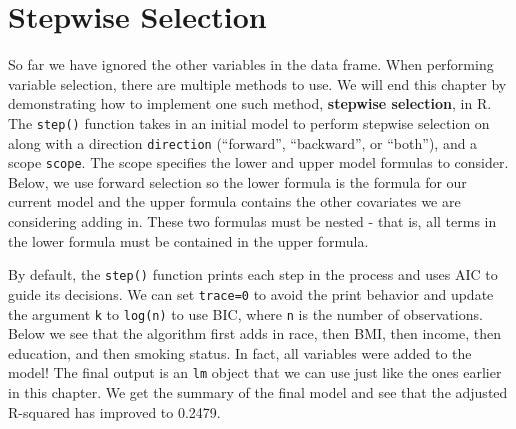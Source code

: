 \documentclass[
  letterpaper,
]{krantz}
\makeatletter
\newenvironment{Shaded}{\begin{snugshade}}{\end{snugshade}}
\newcommand{\CommentTok}[1]{\textcolor[rgb]{0.37,0.37,0.37}{#1}}
\newcommand{\DecValTok}[1]{\textcolor[rgb]{0.68,0.00,0.00}{#1}}
\newcommand{\FunctionTok}[1]{\textcolor[rgb]{0.28,0.35,0.67}{#1}}
\newcommand{\NormalTok}[1]{\textcolor[rgb]{0.00,0.23,0.31}{#1}}
\newcommand{\OtherTok}[1]{\textcolor[rgb]{0.00,0.23,0.31}{#1}}
\newcommand{\SpecialCharTok}[1]{\textcolor[rgb]{0.37,0.37,0.37}{#1}}
\newenvironment{kframe}{%
\medskip{}
\setlength{\fboxsep}{.8em}
 \def\at@end@of@kframe{}%
 \ifinner\ifhmode%
  \def\at@end@of@kframe{\end{minipage}}%
  \begin{minipage}{\columnwidth}%
 \fi\fi%
 \def\FrameCommand##1{\hskip\@totalleftmargin \hskip-\fboxsep
 \colorbox{shadecolor}{##1}\hskip-\fboxsep
     \hskip-\linewidth \hskip-\@totalleftmargin \hskip\columnwidth}%
 \MakeFramed {\advance\hsize-\width
   \@totalleftmargin\z@ \linewidth\hsize
   \@setminipage}}%
 {\par\unskip\endMakeFramed%
 \at@end@of@kframe}
\renewenvironment{Shaded}{\begin{kframe}}{\end{kframe}}
\makeatother
\begin{document}
\begin{Shaded}
\end{Shaded}

\begin{Shaded}
\end{Shaded}

\hypertarget{stepwise-selection}{%
\section{Stepwise Selection}\label{stepwise-selection}}

So far we have ignored the other variables in the data frame. When
performing variable selection, there are multiple methods to use. We
will end this chapter by demonstrating how to implement one such method,
\textbf{stepwise selection}, in R. The \texttt{step()} function takes in
an initial model to perform stepwise selection on along with a direction
\texttt{direction} (``forward'', ``backward'', or ``both''), and a scope
\texttt{scope}. The scope specifies the lower and upper model formulas
to consider. Below, we use forward selection so the lower formula is the
formula for our current model and the upper formula contains the other
covariates we are considering adding in. These two formulas must be
nested - that is, all terms in the lower formula must be contained in
the upper formula.

By default, the \texttt{step()} function prints each step in the process
and uses AIC to guide its decisions. We can set \texttt{trace=0} to
avoid the print behavior and update the argument \texttt{k} to
\texttt{log(n)} to use BIC, where \texttt{n} is the number of
observations. Below we see that the algorithm first adds in race, then
BMI, then income, then education, and then smoking status. In fact, all
variables were added to the model! The final output is an \texttt{lm}
object that we can use just like the ones earlier in this chapter. We
get the summary of the final model and see that the adjusted R-squared
has improved to 0.2479.
\end{document}
